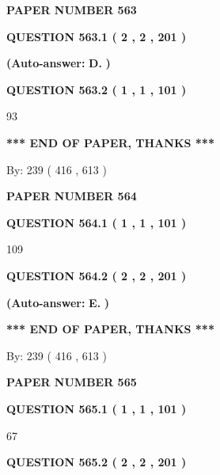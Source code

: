 \documentclass[12pt]{article}
\begin{document}
   
\newpage 
\setcounter{page}{ 
   563001 } 
   
   
 {\textbf{ \Large{ PAPER NUMBER  563  }}}
   
   
   
   
  
  
{\textbf{\large{QUESTION
563.1 
 ( 2 , 2 , 201 )
}}}
 
 
{\textbf{(Auto-answer:}}
{\textbf{\large{
D.}}}
{\textbf{)}}
 
 
  
  
{\textbf{\large{QUESTION
563.2 
 ( 1 , 1 , 101 )
}}}

93
   
   
   
   
\vspace{1.0in} 
{\textbf{\large{ *** END OF PAPER, THANKS *** }}} 
   
   
\hspace{1.0in} By: 
 239 ( 416 ,  613 )
   
   
   
   
\newpage 
\setcounter{page}{ 
   564001 } 
   
   
 {\textbf{ \Large{ PAPER NUMBER  564  }}}
   
   
   
   
  
  
{\textbf{\large{QUESTION
564.1 
 ( 1 , 1 , 101 )
}}}

109
  
  
{\textbf{\large{QUESTION
564.2 
 ( 2 , 2 , 201 )
}}}
 
 
{\textbf{(Auto-answer:}}
{\textbf{\large{
E.}}}
{\textbf{)}}
 
 
   
   
   
   
\vspace{1.0in} 
{\textbf{\large{ *** END OF PAPER, THANKS *** }}} 
   
   
\hspace{1.0in} By: 
 239 ( 416 ,  613 )
   
   
   
   
\newpage 
\setcounter{page}{ 
   565001 } 
   
   
 {\textbf{ \Large{ PAPER NUMBER  565  }}}
   
   
   
   
  
  
{\textbf{\large{QUESTION
565.1 
 ( 1 , 1 , 101 )
}}}

67
  
  
{\textbf{\large{QUESTION
565.2 
 ( 2 , 2 , 201 )
}}}
 
\end{document}

